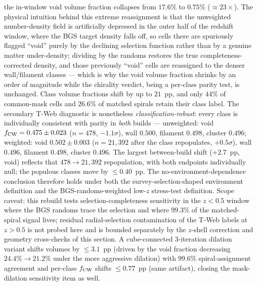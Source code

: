 \documentclass[aps,prd,twocolumn,superscriptaddress,showpacs,preprintnumbers,nofootinbib,longbibliography,floatfix]{revtex4-2}
\begin{document}
the in-window void volume fraction collapses from $17.6\%$ to $0.75\%$
(${\approx}23\times$). The physical intuition behind this extreme
reassignment is that the unweighted number-density field is artificially
depressed in the outer half of the redshift window, where the BGS target
density falls off, so cells there are spuriously flagged ``void'' purely
by the declining selection function rather than by a genuine matter
under-density; dividing by the randoms restores the true completeness-
corrected density, and those previously ``void'' cells are reassigned to
the denser wall/filament classes --- which is why the void volume
fraction shrinks by an order of magnitude while the chirality verdict,
being a per-class parity test, is unchanged. Class volume fractions shift by up to $21$~pp,
and only $44\%$ of common-mask cells and $26.6\%$ of matched spirals
retain their class label. The secondary T-Web diagnostic is nonetheless
\emph{classification-robust}: every class is individually consistent
with parity in \emph{both} builds --- unweighted: void
$f_{\rm CW} = 0.475 \pm 0.023$ ($n=478$, $-1.1\sigma$), wall $0.500$,
filament $0.498$, cluster $0.496$; weighted: void $0.502 \pm 0.003$
($n = 21{,}392$ after the class repopulates, $+0.5\sigma$), wall
$0.496$, filament $0.498$, cluster $0.496$. The largest between-build
shift ($+2.7$~pp, void) reflects that $478 \to 21{,}392$ repopulation,
with both endpoints individually null; the populous classes move by
$\le 0.40$~pp. The no-environment-dependence conclusion therefore holds
under both the survey-selection-shaped environment definition and the
BGS-randoms-weighted low-$z$ stress-test definition. Scope caveat: this rebuild tests
selection-completeness sensitivity in the $z<0.5$ window where the BGS
randoms trace the selection and where $99.3\%$ of the matched-spiral
signal lives; residual radial-selection contamination of the T-Web
labels at $z>0.5$ is not probed here and is bounded separately by the
$z$-shell correction and geometry cross-checks of this section. A
cube-connected 3-iteration dilation variant shifts volumes by
$\le 3.1$~pp (driven by the void fraction decreasing
$24.4\% \to 21.2\%$ under the more aggressive dilation) with $99.6\%$
spiral-assignment agreement and per-class $f_{\rm CW}$ shifts
$\le 0.77$~pp (same artifact), closing the mask-dilation sensitivity
item as well.
\end{document}
